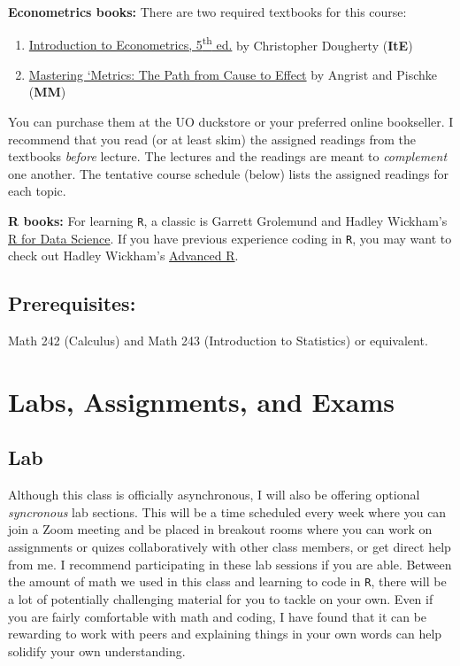 \documentclass[
  letterpaper,
  DIV=11,
  numbers=noendperiod]{scrartcl}
\providecommand{\tightlist}{%
  \setlength{\itemsep}{0pt}\setlength{\parskip}{0pt}}\usepackage{longtable,booktabs,array}
\begin{document}
\textbf{Econometrics books:} There are two required textbooks for this
course:

\begin{enumerate}
\def\labelenumi{\arabic{enumi}.}
\tightlist
\item
  \href{http://www.amazon.com/Introduction-Econometrics-Christopher-Dougherty/dp/0199676828/}{Introduction
  to Econometrics, 5\textsuperscript{th} ed.} by Christopher Dougherty
  (\textbf{ItE})
\item
  \href{https://www.amazon.com/Mastering-Metrics-Path-Cause-Effect/dp/0691152845/}{Mastering
  `Metrics: The Path from Cause to Effect} by Angrist and Pischke
  (\textbf{MM})
\end{enumerate}

You can purchase them at the UO duckstore or your preferred online
bookseller. I recommend that you read (or at least skim) the assigned
readings from the textbooks \emph{before} lecture. The lectures and the
readings are meant to \emph{complement} one another. The tentative
course schedule (below) lists the assigned readings for each topic.

\textbf{R books:} For learning \texttt{R}, a classic is Garrett
Grolemund and Hadley Wickham's \href{http://r4ds.had.co.nz}{R for Data
Science}. If you have previous experience coding in \texttt{R}, you may
want to check out Hadley Wickham's
\href{http://adv-r.had.co.nz/}{Advanced R}.

\subsection{Prerequisites:}\label{prerequisites}

Math 242 (Calculus) and Math 243 (Introduction to Statistics) or
equivalent.

\section{Labs, Assignments, and Exams}\label{labs-assignments-and-exams}

\subsection{Lab}\label{lab}

Although this class is officially asynchronous, I will also be offering
optional \emph{syncronous} lab sections. This will be a time scheduled
every week where you can join a Zoom meeting and be placed in breakout
rooms where you can work on assignments or quizes collaboratively with
other class members, or get direct help from me. I recommend
participating in these lab sessions if you are able. Between the amount
of math we used in this class and learning to code in \texttt{R}, there
will be a lot of potentially challenging material for you to tackle on
your own. Even if you are fairly comfortable with math and coding, I
have found that it can be rewarding to work with peers and explaining
things in your own words can help solidify your own understanding.
\end{document}

